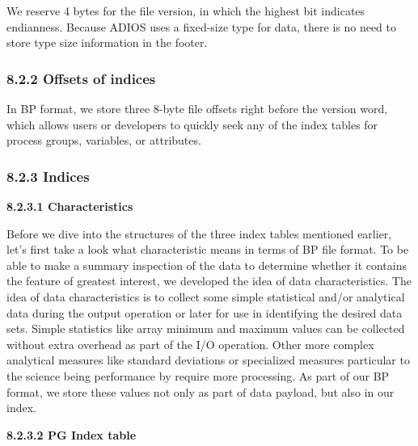 \vspace{10pt}
We reserve 4 bytes for the file version, in which the highest bit indicates endianness. 
Because ADIOS uses a fixed-size type for data, there is no need to store type size 
information in the footer. \label{HToc84890272}\label{HToc212016648}\label{HToc212016890}\label{HToc182553419}

\vspace{10pt}
\subsubsection*{{\large \textbf{8.2.2 Offsets of indices}}}

\vspace{10pt}
In BP format, we store three 8-byte file offsets right before the version word, 
which allows users or developers to quickly seek any of the index tables for process 
groups, variables, or attributes. \label{HToc84890273}\label{HToc212016649}\label{HToc212016891}\label{HToc182553420}

\vspace{10pt}
\subsubsection*{{\large \textbf{8.2.3 Indices}}}

\vspace{10pt}
\textbf{8.2.3.1 Characteristics}

\vspace{10pt}
Before we dive into the structures of the three index tables mentioned earlier, 
let's first take a look what characteristic means in terms of BP file format. To 
be able to make a summary inspection of the data to determine whether it contains 
the feature of greatest interest, we developed the idea of data characteristics. 
The idea of data characteristics is to collect some simple statistical and/or analytical 
data during the output operation or later for use in identifying the desired data 
sets. Simple statistics like array minimum and maximum values can be collected 
without extra overhead as part of the I/O operation. Other more complex analytical 
measures like standard deviations or specialized measures particular to the science 
being performance by require more processing. As part of our BP format, we store 
these values not only as part of data payload, but also in our index. 

\vspace{10pt}
\textbf{8.2.3.2 PG Index table}

